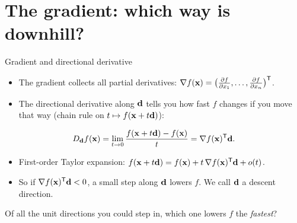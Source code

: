 \section{The gradient: which way is downhill?}

\begin{frame}{Gradient and directional derivative}
  \begin{itemize}\small
    \item The gradient collects all partial derivatives: $\nabla f(\mathbf{x}) = \bigl(\tfrac{\partial f}{\partial x_1},\dots,\tfrac{\partial f}{\partial x_n}\bigr)^{\mathsf T}$.
    \item The directional derivative along $\mathbf{d}$ tells you how fast $f$ changes if you move that way
          (chain rule on $t\mapsto f(\mathbf{x}+t\mathbf{d})$):
  \end{itemize}
  \[
    D_{\mathbf{d}} f(\mathbf{x}) = \lim_{t\to0}\frac{f(\mathbf{x} + t\mathbf{d}) - f(\mathbf{x})}{t} = \nabla f(\mathbf{x})^{\mathsf T}\mathbf{d} .
  \]
  \begin{itemize}\small
    \item First-order Taylor expansion: $f(\mathbf{x} + t\mathbf{d}) = f(\mathbf{x}) + t\,\nabla f(\mathbf{x})^{\mathsf T}\mathbf{d} + o(t)$.
    \item So if $\nabla f(\mathbf{x})^{\mathsf T}\mathbf{d} < 0$, a small step along $\mathbf{d}$ lowers $f$. We call $\mathbf{d}$ a \alert{descent direction}.
  \end{itemize}
  \begin{keybox}
    Of all the unit directions you could step in, which one lowers $f$ the \emph{fastest}?
  \end{keybox}
\end{frame}

